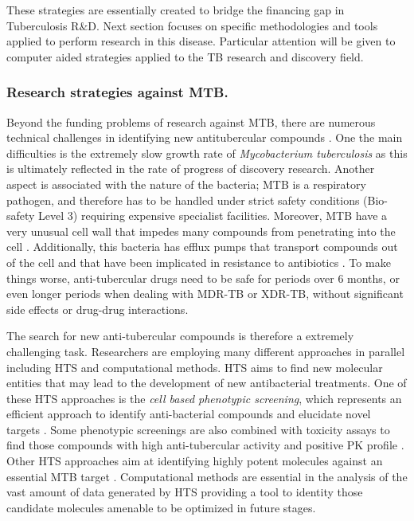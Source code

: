 \documentclass[11pt, b5paper,twoside]{tesi_upf}
\begin{document}
\par These strategies are essentially created to bridge the financing gap in Tuberculosis R$\&$D. Next section focuses on specific methodologies and tools applied to perform research in this disease. Particular attention will be given to computer aided strategies applied to the TB research and discovery field. 

\subsubsection{Research strategies against MTB.}\label{mtb_research}

\par Beyond the funding problems of research against MTB, there are numerous technical challenges in identifying new antitubercular compounds \cite{Zuniga2015}. One the main difficulties is the extremely slow growth rate of \textit{Mycobacterium tuberculosis} as this is ultimately reflected in the rate of progress of discovery research. Another aspect is associated with the nature of the bacteria; MTB is a respiratory pathogen, and therefore has to be handled under strict safety conditions (Bio-safety Level 3) requiring expensive specialist facilities. Moreover, MTB have a very unusual cell wall that impedes many compounds from penetrating into the cell \cite{Brennan2003}. Additionally, this bacteria has efflux pumps that transport compounds out of the cell and that have been implicated in resistance to antibiotics \cite{Rodrigues2012}. To make things worse, anti-tubercular drugs need to be safe for periods over 6 months, or even longer periods when dealing with MDR-TB or XDR-TB, without significant side effects or drug-drug interactions. 
\par The search for new anti-tubercular compounds is therefore a extremely challenging task. Researchers are employing many different approaches in parallel including HTS and computational methods. HTS aims to find new molecular entities that may lead to the development of new antibacterial treatments. One of these HTS approaches is the \textit{cell based phenotypic screening}, which represents an efficient approach to identify anti-bacterial compounds and elucidate novel targets \cite{Manjunatha2015}. Some phenotypic screenings are also combined with toxicity assays to find those compounds with high anti-tubercular activity and positive PK profile \cite{Ballell2013}. Other HTS approaches aim at identifying highly potent molecules against an essential MTB target \cite{Park2015, Arora2014}.  Computational methods are essential in the analysis of the vast amount of data generated by HTS providing a tool to identity those candidate molecules amenable to be optimized in future stages. 
\end{document}
